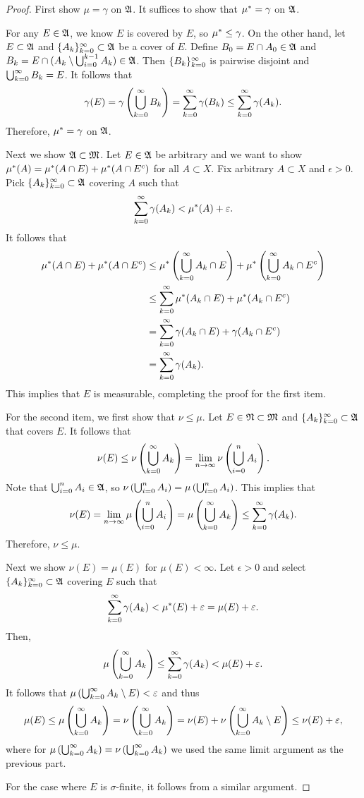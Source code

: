 \documentclass[a4paper]{article}
\begin{document}
\begin{proof}
First show $\mu = \gamma$ on $\mathfrak{A}$.
It suffices to show that $\mu^* = \gamma$ on $\mathfrak{A}$.

For any $E \in \mathfrak{A}$, we know $E$ is covered by $E$, so
$\mu^* \leq \gamma$. On the other hand, let $E \subset \mathfrak{A}$
and $\{ A_k \}_{k=0}^\infty \subset \mathfrak{A}$ be a cover of $E$.
Define $B_0 = E \cap A_0 \in \mathfrak{A}$ and
$B_k = E \cap (A_k \setminus \bigcup_{i=0}^{k-1} A_k) \in \mathfrak{A}$.
Then $\{ B_k \}_{k=0}^\infty$ is pairwise disjoint and
$\bigcup_{k=0}^\infty B_k = E$. It follows that
\[
\gamma(E) = \gamma \left( \bigcup_{k=0}^\infty B_k \right)
= \sum_{k=0}^\infty \gamma(B_k) \leq \sum_{k=0}^\infty \gamma(A_k).
\]
Therefore, $\mu^* = \gamma$ on $\mathfrak{A}$.

Next we show $\mathfrak{A} \subset \mathfrak{M}$. Let $E \in \mathfrak{A}$
be arbitrary and we want to show $\mu^*(A)
= \mu^*(A \cap E) + \mu^* (A \cap E^c)$ for all
$A \subset X$. Fix arbitrary $A \subset X$ and
$\epsilon > 0$. Pick $\{ A_k \}_{k=0}^\infty \subset \mathfrak{A}$
covering $A$ such that
\[
\sum_{k=0}^\infty \gamma (A_k) < \mu^*(A) + \varepsilon.
\]
It follows that
\[
\begin{aligned}
\mu^*(A \cap E) + \mu^*(A \cap E^c)
&\leq \mu^* \left( \bigcup_{k=0}^\infty A_k \cap E \right)
+ \mu^* \left( \bigcup_{k=0}^\infty A_k \cap E^c \right) \\
&\leq \sum_{k=0}^\infty \mu^*(A_k \cap E) + \mu^*(A_k \cap E^c) \\
&= \sum_{k=0}^\infty \gamma(A_k \cap E) + \gamma(A_k \cap E^c) \\
&= \sum_{k=0}^\infty \gamma(A_k).
\end{aligned}
\]
This implies that $E$ is measurable, completing the proof
for the first item.

For the second item, we first show that $\nu \leq \mu$.
Let $E \in \mathfrak{N} \subset \mathfrak{M}$ and $\{ A_k \}_{k=0}^\infty \subset \mathfrak{A}$
that covers $E$. It follows that
\[
\nu(E) \leq \nu \left( \bigcup_{k=0}^\infty A_k \right)
= \lim_{n \to \infty} \nu \left( \bigcup_{i=0}^n A_i \right).
\]
Note that $\bigcup_{i=0}^n A_i \in \mathfrak{A}$, so
$\nu \left( \bigcup_{i=0}^n A_i \right) = \mu \left( \bigcup_{i=0}^n
A_i \right)$. This implies that
\[
\nu(E) = \lim_{n \to \infty} \mu \left( \bigcup_{i=0}^n A_i \right)
= \mu \left( \bigcup_{k=0}^\infty A_k \right) \leq \sum_{k=0}^\infty \gamma(A_k).
\]
Therefore, $\nu \leq \mu$.

Next we show $\nu(E) = \mu(E)$ for $\mu(E) < \infty$.
Let $\epsilon > 0$ and select $\{ A_k \}_{k=0}^\infty \subset \mathfrak{A}$
covering $E$ such that
\[
\sum_{k=0}^\infty \gamma(A_k) < \mu^*(E) + \varepsilon = \mu(E) + \varepsilon.
\]
Then,
\[
\mu \left( \bigcup_{k=0}^\infty A_k \right)
\leq \sum_{k=0}^\infty \gamma(A_k) < \mu(E) + \varepsilon.
\]
It follows that $\mu \left( \bigcup_{k=0}^\infty A_k \setminus E \right)
< \varepsilon$ and thus
\[
\begin{aligned}
\mu(E)
\leq \mu \left( \bigcup_{k=0}^\infty A_k \right)
= \nu \left( \bigcup_{k=0}^\infty A_k \right)
= \nu (E) + \nu \left( \bigcup_{k=0}^\infty A_k \setminus E \right)
\leq \nu(E) + \varepsilon,
\end{aligned}
\]
where for $\mu \left( \bigcup_{k=0}^\infty A_k \right)
= \nu \left( \bigcup_{k=0}^\infty A_k \right)$ we used the same limit argument
as the previous part.

For the case where $E$ is $\sigma$-finite, it follows from
a similar argument.

\end{proof}
\end{document}
